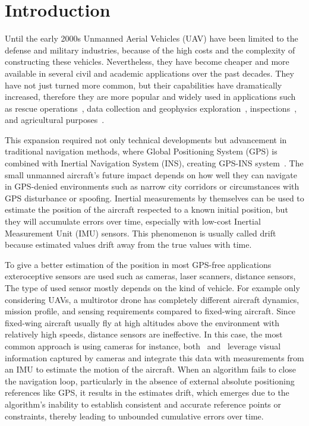 \chapter{Introduction}

Until the early 2000s Unmanned Aerial Vehicles (UAV) have been limited to the defense and military industries, because of the high costs and the complexity of constructing these vehicles. Nevertheless, they have become cheaper and more available in several civil and academic applications over the past decades. They have not just turned more common, but their capabilities have dramatically increased, therefore they are more popular and widely used in applications such as rescue operations~\cite{rescue-operations}, data collection and geophysics exploration~\cite{data-collection}, inspections~\cite{inspection}, and agricultural purposes~\cite{agriculure}.

This expansion required not only technical developments but advancement in traditional navigation methods, where Global Positioning System (GPS) is combined with Inertial Navigation System (INS), creating GPS-INS system~\cite{gps-ins}. The small unmanned aircraft's future impact depends on how well they can navigate in GPS-denied environments such as narrow city corridors or circumstances with GPS disturbance or spoofing.  Inertial measurements by themselves can be used to estimate the position of the aircraft respected to a known initial position, but they will accumulate errors over time, especially with low-cost Inertial Measurement Unit (IMU) sensors. This phenomenon is usually called drift because estimated values drift away from the true values with time.

To give a better estimation of the position in most GPS-free applications exteroceptive sensors are used such as cameras, laser scanners, distance sensors, \etc{} The type of used sensor mostly depends on the kind of vehicle. For example only considering UAVs, a multirotor drone has completely different aircraft dynamics, mission profile, and sensing requirements compared to fixed-wing aircraft. Since fixed-wing aircraft usually fly at high altitudes above the environment with relatively high speeds, distance sensors are ineffective. In this case, the most common approach is using cameras for instance, both~\cite{gps-ins-cam} and~\cite{rel-nav} leverage visual information captured by cameras and integrate this data with measurements from an IMU to estimate the motion of the aircraft. When an algorithm fails to close the navigation loop, particularly in the absence of external absolute positioning references like GPS, it results in the estimates drift, which emerges due to the algorithm's inability to establish consistent and accurate reference points or constraints, thereby leading to unbounded cumulative errors over time.

